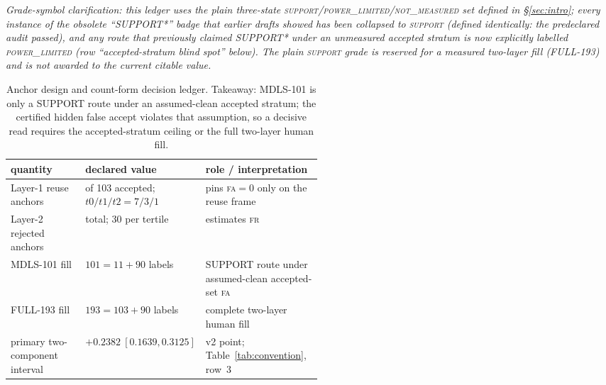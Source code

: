 \documentclass{article}
\begin{document}
\begin{table}[t]
\centering
\caption{Anchor design and count-form decision ledger.  Takeaway: MDLS-101 is only a
SUPPORT route under an assumed-clean accepted stratum; the certified hidden false
accept violates that assumption, so a decisive read requires the accepted-stratum
ceiling or the full two-layer human fill.}
\begin{minipage}{\linewidth}\small\raggedright\emph{Grade-symbol clarification: this ledger uses
the plain three-state
\textsc{support}/\textsc{power\_limited}/\textsc{not\_measured} set defined in
\S\ref{sec:intro}; every instance of the obsolete ``SUPPORT*'' badge that earlier
drafts showed has been collapsed to \textsc{support} (defined identically:
the predeclared audit passed), and any route that previously claimed SUPPORT*
under an unmeasured accepted stratum is now explicitly labelled \textsc{power\_limited}
(row ``accepted-stratum blind spot'' below).  The plain
\textsc{support} grade is reserved for a measured two-layer fill (FULL-193)
and is not awarded to the current citable value.}\end{minipage}
\vspace{2pt}
\label{tab:anchor-design}
\begin{tabularx}{\linewidth}{@{}>{\raggedright\arraybackslash}p{0.24\linewidth}>{\raggedright\arraybackslash}p{0.27\linewidth}X@{}}
\toprule
quantity & declared value & role / interpretation \\
\midrule
Layer-1 reuse anchors & 11 of 103 accepted; $t0/t1/t2=7/3/1$ & pins \textsc{fa}$=0$ only on the reuse frame \\
Layer-2 rejected anchors & 90 total; 30 per tertile & estimates \textsc{fr} \\
MDLS-101 fill & $101=11+90$ labels & SUPPORT route under assumed-clean accepted-set \textsc{fa} \\
FULL-193 fill & $193=103+90$ labels & complete two-layer human fill \\
primary two-component interval & $+0.2382\ [0.1639,0.3125]$ & v2 point; Table~\ref{tab:convention}, row~3 \\

\end{tabularx}
\end{table}
\end{document}

